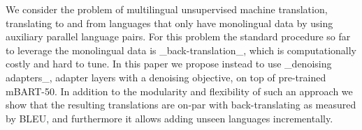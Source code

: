 We consider the problem of multilingual unsupervised machine translation, translating to and from languages that only have monolingual data by using auxiliary parallel language pairs. For this problem the standard procedure so far to leverage the monolingual data is \_back-translation\_, which is computationally costly and hard to tune. In this paper we propose instead to use \_denoising adapters\_, adapter layers with a denoising objective, on top of pre-trained mBART-50. In addition to the modularity and flexibility of such an approach we show that the resulting translations are on-par with back-translating as measured by BLEU, and furthermore it allows adding unseen languages incrementally.
